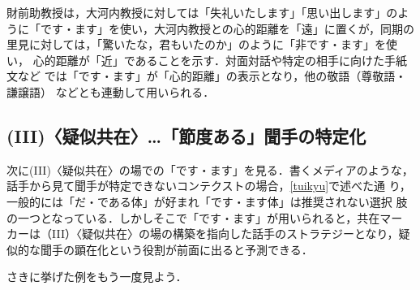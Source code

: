 \documentclass[japanese]{jnlp_1.3c}
\begin{document}
財前助教授は，大河内教授に対しては「失礼いたします」「思い出します」のよ
うに「です・ます」を使い，大河内教授との心的距離を「遠」に置くが，同期の
里見に対しては，「驚いたな，君もいたのか」のように「非です・ます」を使い，
心的距離が「近」であることを示す．対面対話や特定の相手に向けた手紙文など
では「です・ます」が「心的距離」の表示となり，他の敬語（尊敬語・謙譲語）
などとも連動して用いられる．

\subsection{(III)〈疑似共在〉{\unskip}…{\unskip}「節度ある」聞手の特定化}

次に(III)〈疑似共在〉の場での「です・ます」を見る．書くメディアのような，
話手から見て聞手が特定できないコンテクストの場合，\ref{tuikyu}で述べた通
り，一般的には「だ・である体」が好まれ「です・ます体」は推奨されない選択
肢の一つとなっている．しかしそこで「です・ます」が用いられると，共在マー
カーは（III）〈疑似共在〉の場の構築を指向した話手のストラテジーとなり，疑
似的な聞手の顕在化という役割が前面に出ると予測できる．

さきに挙げた例をもう一度見よう．

\end{document}
